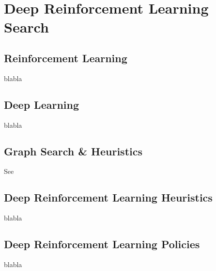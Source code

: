 
\chapter{Deep Reinforcement Learning Search} %

\label{Chapter1} %


\section{Reinforcement Learning}

blabla


\section{Deep Learning}

blabla


\section{Graph Search \& Heuristics}

See \cite{DBLP:journals/jacm/DechterP85}



\section{Deep Reinforcement Learning Heuristics}

blabla



\section{Deep Reinforcement Learning Policies}

blabla